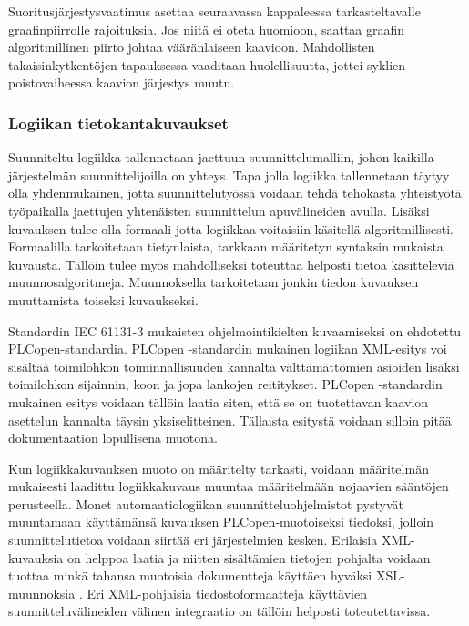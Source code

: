 \documentclass[finnish,12pt]{article}
\begin{document}
Suoritusjärjestysvaatimus asettaa seuraavassa kappaleessa tarkasteltavalle graafinpiirrolle rajoituksia.
Jos niitä ei oteta huomioon, saattaa graafin algoritmillinen piirto johtaa vääränlaiseen kaavioon.
Mahdollisten takaisinkytkentöjen tapauksessa vaaditaan huolellisuutta, jottei syklien poistovaiheessa kaavion järjestys muutu.


		\subsubsection{Logiikan tietokantakuvaukset}

Suunniteltu logiikka tallennetaan jaettuun suunnittelumalliin, johon kaikilla järjestelmän suunnittelijoilla on yhteys.
Tapa jolla logiikka tallennetaan täytyy olla yhdenmukainen, jotta suunnittelutyössä voidaan tehdä tehokasta yhteistyötä työpaikalla jaettujen yhtenäisten suunnittelun apuvälineiden avulla.
Lisäksi kuvauksen tulee olla formaali jotta logiikkaa voitaisiin käsitellä algoritmillisesti.
Formaalilla tarkoitetaan tietynlaista, tarkkaan määritetyn syntaksin mukaista kuvausta.
Tällöin tulee myös mahdolliseksi toteuttaa helposti tietoa käsitteleviä muunnosalgoritmeja.
Muunnoksella tarkoitetaan jonkin tiedon kuvauksen muuttamista toiseksi kuvaukseksi.

Standardin IEC 61131-3 mukaisten ohjelmointikielten kuvaamiseksi on ehdotettu PLCopen-standardia.
PLCopen -standardin mukainen logiikan XML-esitys voi sisältää toimilohkon toiminnallisuuden kannalta välttämättömien asioiden lisäksi toimilohkon sijainnin, koon ja jopa lankojen reititykset.
PLCopen -standardin mukainen esitys voidaan tällöin laatia siten, että se on tuotettavan kaavion asettelun kannalta täysin yksiselitteinen.
Tällaista esitystä voidaan silloin pitää dokumentaation lopullisena muotona. \cite{RefWorks:64}

Kun logiikkakuvauksen muoto on määritelty tarkasti, voidaan määritelmän mukaisesti laadittu logiikkakuvaus muuntaa määritelmään nojaavien sääntöjen perusteella.
Monet automaatiologiikan suunnitteluohjelmistot pystyvät muuntamaan käyttämänsä kuvauksen PLCopen-muotoiseksi tiedoksi, jolloin suunnittelutietoa voidaan siirtää eri järjestelmien kesken.
Erilaisia XML-kuvauksia on helppoa laatia ja niitten sisältämien tietojen pohjalta voidaan tuottaa minkä tahansa muotoisia dokumentteja käyttäen hyväksi XSL-muunnoksia \cite{RefWorks:61}. Eri XML-pohjaisia tiedostoformaatteja käyttävien suunnitteluvälineiden välinen integraatio on tällöin helposti toteutettavissa.
\end{document}
